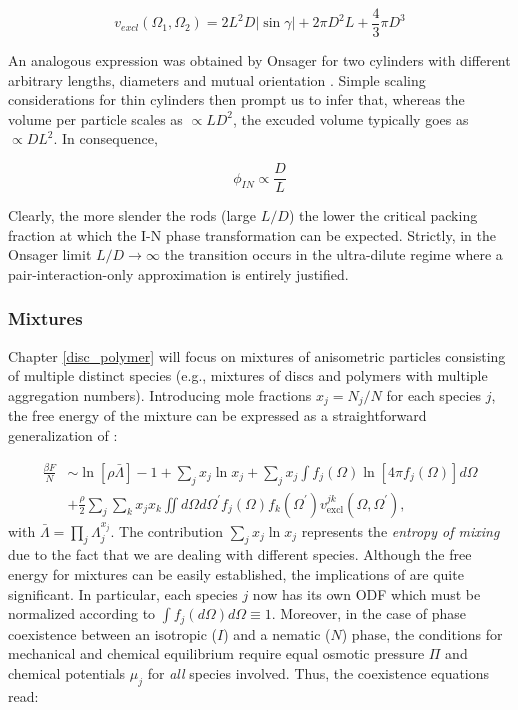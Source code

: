 \begin{equation}
v_{excl}(\Omega_1,\Omega_2) = 2L^2D |\sin\gamma|+2\pi D^2 L + \frac{4}{3}\pi D^3
\end{equation}

An analogous expression was obtained by Onsager for two cylinders with different arbitrary lengths, diameters and mutual orientation \cite{onsager1949}. Simple scaling considerations for thin cylinders then prompt us to infer that, whereas the volume per particle scales as $\propto L D^2$, the excuded volume typically goes as $\propto D L^2$. In consequence,


\begin{equation}
\phi_{IN} \propto \frac{D}{L}
\end{equation}

Clearly, the more slender the rods (large $L/D$) the lower the critical packing fraction at which the I-N phase transformation can be expected. Strictly, in the Onsager limit $L/D \rightarrow \infty$ the transition occurs in the ultra-dilute regime where a pair-interaction-only approximation is entirely justified.

\subsubsection{Mixtures}

Chapter \ref{disc_polymer} will focus on mixtures of anisometric particles consisting of multiple distinct species (e.g., mixtures of discs and polymers with multiple aggregation numbers). Introducing mole fractions $x_{j}=N_{j}/N$ for each species $j$, the free energy of the mixture can be expressed as a straightforward generalization of :

\begin{align}
\frac{\beta F}{N} &\sim \ln [\rho \bar{\Lambda}]-1 + \sum_{j} x_{j} \ln x_{j} +
\sum_{j} x_{j} \int f_{j}(\Omega)\ln \left[ 4 \pi f_{j}(\Omega) \right] d \Omega \nonumber \\
&+\frac{\rho}{2}\sum_{j}\sum_{k}x_{j}x_{k} \iint  d \Omega d\Omega^{\prime}
f_{j}(\Omega)f_{k}(\Omega^{\prime})
v_{\text{excl}}^{jk}(\Omega,\Omega^{\prime}),  \label{0freetotmulti}
\end{align}
with $\bar{\Lambda}=\prod_{j}\Lambda_{j}^{x_{j}}$. The contribution $\sum_{j} x_{j} \ln x_{j}$ represents the {\em entropy of mixing} due to the fact that we are dealing with different species. Although the free energy for mixtures can be easily established,  the implications of  are quite significant. In particular, each species $j$ now has its own ODF which must be normalized according to $\int f_{j}(d\Omega)d\Omega \equiv 1$. Moreover, in the case of phase coexistence between an isotropic ($I$) and a nematic ($N$) phase, the conditions for mechanical and chemical equilibrium require equal osmotic pressure $\Pi$ and chemical potentials $\mu_{j}$ for {\em all} species involved. Thus, the coexistence equations read:

